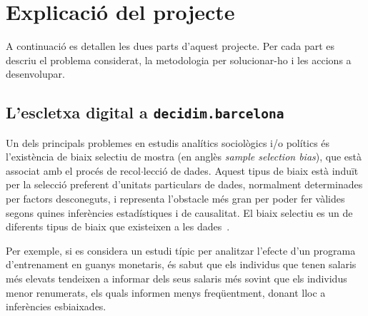 \documentclass[final,10pt]{article}
\begin{document}
\section{Explicaci\'o del projecte}
A continuaci\'o es detallen les dues parts d'aquest projecte.
Per cada part es descriu el problema considerat, la metodologia per solucionar-ho i les accions a desenvolupar.

\subsection{L'escletxa digital a \texttt{decidim.barcelona}}
\label{partI}
Un dels principals problemes en estudis anal\'itics sociol\`ogics i/o pol\'itics \'es l'exist\`encia
de biaix selectiu de mostra (en angl\`es \emph{sample selection bias}), que est\`a associat amb el proc\'es de
recol$\cdot$lecci\'o de dades. Aquest tipus de biaix est\`a indu\"it per la selecci\'o preferent
d'unitats particulars de dades, normalment determinades per factors desconeguts,
 i representa l'obstacle m\'es gran per poder fer v\`alides segons quines infer\`encies estad\'istiques i de causalitat.
El biaix selectiu es un de diferents tipus de biaix que existeixen a les dades~\cite{Bareinboim05072016}.

Per exemple, si es considera un estudi t\'ipic per analitzar l'efecte d'un programa d'entrenament en guanys monetaris, \'es sabut que els individus que tenen salaris m\'es elevats tendeixen a informar dels seus salaris m\'es sovint que els individus menor renumerats, els quals informen menys freq\"uentment, donant lloc a infer\`encies esbiaixades.
\end{document}
